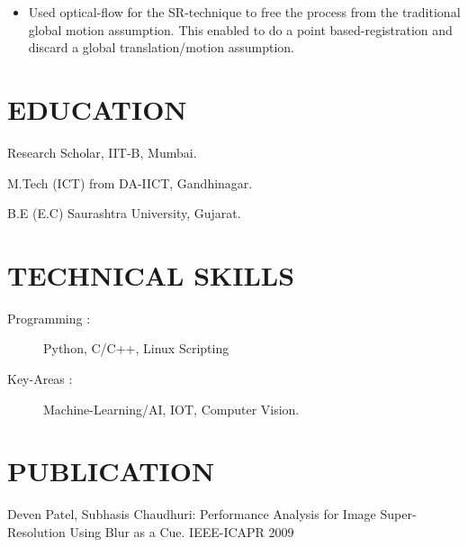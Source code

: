 \documentclass{res}
\begin{document}
\begin{resume}
\begin{itemize}
\item  Used optical-flow for  the SR-technique to  free the process  from the traditional global motion assumption. This enabled to do a point based-registration  and discard a global translation/motion assumption.
\end{itemize}

\section{EDUCATION}          
\begin{description}
 \item    Research Scholar, IIT-B, Mumbai. 
  \item  M.Tech (ICT) from DA-IICT, Gandhinagar.  
   \item     B.E (E.C) Saurashtra University, Gujarat.   
\end{description}    

\section{TECHNICAL SKILLS}          
\begin{description}
\item [Programming      :] Python, C/C++, Linux Scripting 
\item [Key-Areas        :] Machine-Learning/AI, IOT, Computer Vision. 
\end{description}


\section{PUBLICATION}
\begin{description}
\item   Deven Patel, Subhasis Chaudhuri: Performance Analysis for Image Super-Resolution Using Blur as a Cue. IEEE-ICAPR 2009
\end{description}



 
\end{resume}
\end{document}
